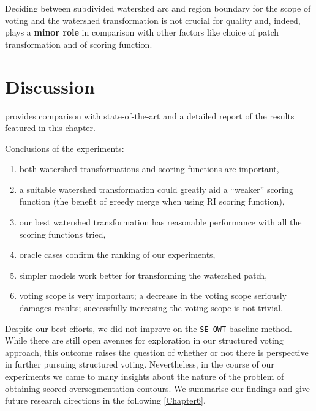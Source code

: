 Deciding between subdivided watershed arc and region boundary for the scope of voting and the watershed transformation is not %
crucial for quality %
and, indeed, plays %
a {\bf minor role} in comparison with other factors like choice of patch transformation and of scoring function.

\section{Discussion}

 provides comparison with state-of-the-art and a detailed report of the results featured in this chapter.


Conclusions of the experiments:
\begin{enumerate}
 \item both watershed transformations and scoring functions are important,
 \item a suitable %
 watershed transformation could greatly aid a ``weaker'' scoring function (\eg the benefit of greedy merge when using RI scoring function),
 \item our best watershed transformation has reasonable performance with all the scoring functions tried,
 \item oracle cases confirm the ranking of our experiments,
 \item simpler models work better for transforming the watershed patch, %
 \item voting scope is very important; a decrease in the voting scope seriously damages results; successfully increasing the voting scope is not trivial.
\end{enumerate}

Despite our best efforts, we did not improve on the {\tt SE-OWT} baseline method. While there are still open avenues for exploration in our structured voting approach, this outcome raises the %
question of whether or not there is perspective in further pursuing structured voting. Nevertheless, in the course of our experiments we came to many insights about the nature of the problem of obtaining scored oversegmentation %
contours. We summarise our findings and give future research directions in the following \cref{Chapter6}.